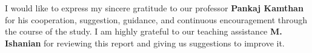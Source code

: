 I would like to express my sincere gratitude to our professor \textbf{Pankaj Kamthan} for his cooperation, suggestion, guidance, and continuous encouragement through the course of the study. I am highly grateful to our teaching assistance \textbf{M. Ishanian} for reviewing this report and giving us suggestions to improve it.\\